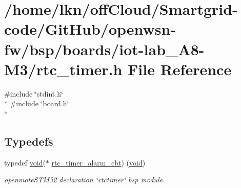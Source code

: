 \hypertarget{iot-lab___a8-_m3_2rtc__timer_8h}{}\section{/home/lkn/off\+Cloud/\+Smartgrid-\/code/\+Git\+Hub/openwsn-\/fw/bsp/boards/iot-\/lab\+\_\+\+A8-\/\+M3/rtc\+\_\+timer.h File Reference}
\label{iot-lab___a8-_m3_2rtc__timer_8h}
{\ttfamily \#include \char`\"{}stdint.\+h\char`\"{}}\\*
{\ttfamily \#include \char`\"{}board.\+h\char`\"{}}\\*
\subsection*{Typedefs}
\begin{DoxyCompactItemize}
\item 
typedef \hyperlink{usb__devapi_8h_afabf60e7f57651d6d595a02c75f07cd0}{void}($\ast$ \hyperlink{iot-lab___a8-_m3_2rtc__timer_8h_a3854a3297c7095644b61891e55d5e717}{rtc\+\_\+timer\+\_\+alarm\+\_\+cbt}) (\hyperlink{usb__devapi_8h_afabf60e7f57651d6d595a02c75f07cd0}{void})
\begin{DoxyCompactList}\small\item\em openmote\+S\+T\+M32 declaration \char`\"{}rtctimer\char`\"{} bsp module. \end{DoxyCompactList}\end{DoxyCompactItemize}
